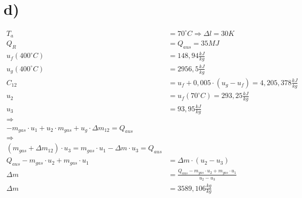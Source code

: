 

\section*{d)}

\begin{align*}
T_a &= 70^\circ C \Rightarrow \Delta l = 30 K \\
Q_R &= Q_{aus} = 35 MJ \\
u_f(400^\circ C) &= 148,94 \frac{kJ}{kg} \\
u_g(400^\circ C) &= 2956,5 \frac{kJ}{kg} \\
C_{12} &= u_f + 0,005 \cdot (u_g - u_f) = 4,205,378 \frac{kJ}{kg} \\
u_2 &= u_f(70^\circ C) = 293,25 \frac{kJ}{kg} \\
u_3 &= 93,95 \frac{kJ}{kg} \\
\Rightarrow & \\
-m_{gas} \cdot u_1 + u_2 \cdot m_{gas} + u_g \cdot \Delta m_{12} = Q_{aus} \\
\Rightarrow & \\
(m_{gas} + \Delta m_{12}) \cdot u_3 = m_{gas} \cdot u_1 - \Delta m \cdot u_3 = Q_{aus} \\
Q_{aus} - m_{gas} \cdot u_2 + m_{gas} \cdot u_1 &= \Delta m \cdot (u_2 - u_3) \\
\Delta m &= \frac{Q_{aus} - m_{gas} \cdot u_2 + m_{gas} \cdot u_1}{u_2 - u_3} \\
\Delta m &= 3589,106 \frac{kg}{kg} \\
\end{align*}